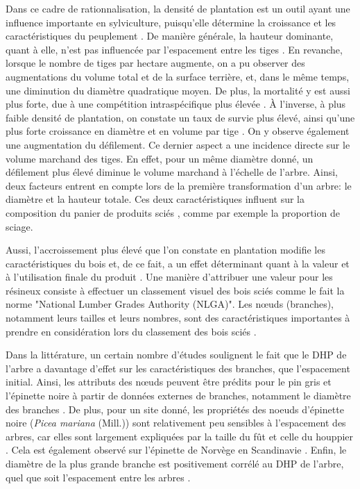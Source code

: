 \documentclass[letterpaper, 12pt]{article}
\begin{document}
\begin{onehalfspace}
Dans ce cadre de rationnalisation, la densité de plantation est un outil ayant une influence importante en sylviculture, puisqu'elle détermine la croissance et les caractéristiques du peuplement \cite{Thiffault2003}. De manière générale, la hauteur dominante, quant à elle, n'est pas influencée par l'espacement entre les tiges \cite{Gizachew2012}. En revanche, lorsque le nombre de tiges par hectare augmente, on a pu observer des augmentations du volume total et de la surface terrière, et, dans le même temps, une diminution du diamètre quadratique moyen. De plus, la mortalité y est aussi plus forte, due à une compétition intraspécifique plus élevée \cite{Groot2016, Will2010}. À l'inverse, à plus faible densité de plantation, on constate un taux de survie plus élevé, ainsi qu'une plus forte croissance en diamètre et en volume par tige \cite{Akers2013}. On y observe également une augmentation du défilement. Ce dernier aspect a une incidence directe sur le volume marchand des tiges. En effet, pour un même diamètre donné, un défilement plus élevé diminue le volume marchand à l'échelle de l'arbre\cite{Pregent1998}. Ainsi, deux facteurs entrent en compte lors de la première transformation d'un arbre: le diamètre et la hauteur totale. Ces deux caractéristiques influent sur la composition du panier de produits sciés \cite{Auty2014}, comme par exemple la proportion de sciage. 

\vspace{12pt}

Aussi, l'accroissement plus élevé que l'on constate en plantation modifie les caractéristiques du bois et, de ce fait, a un effet déterminant quant à la valeur et à l'utilisation finale du produit \cite{Zhang2002}. Une manière d'attribuer une valeur pour les résineux consiste à effectuer un classement visuel des bois sciés comme le fait la norme "National Lumber Grades Authority (NLGA)". Les nœuds (branches), notamment leurs tailles et leurs nombres, sont des caractéristiques importantes à prendre en considération lors du classement des bois sciés \cite{Lemieux2000}. 

\vspace{12pt}

Dans la littérature, un certain nombre d'études soulignent le fait que le DHP de l'arbre a davantage d'effet sur les caractéristiques des branches, que l'espacement initial. Ainsi, les attributs des nœuds peuvent être prédits pour le pin gris et l’épinette noire à partir de données externes de branches, notamment le diamètre des branches \cite{Duchateau2013}. De plus, pour un site donné, les propriétés des noeuds d'épinette noire (\textit{Picea mariana} (Mill.)) sont relativement peu sensibles à l'espacement des arbres, car elles sont largement expliquées par la taille du fût et celle du houppier \cite{Benjamin2009, Zhang2005}. Cela est également observé sur l'épinette de Norvège en Scandinavie \cite{Johansson1992, Makinen1999, Pfister2007}. Enfin, le diamètre de la plus grande branche est positivement corrélé au DHP de l'arbre, quel que soit l'espacement entre les arbres \cite{Hebert2016, Tong2005}. 


\end{onehalfspace}
\end{document}
